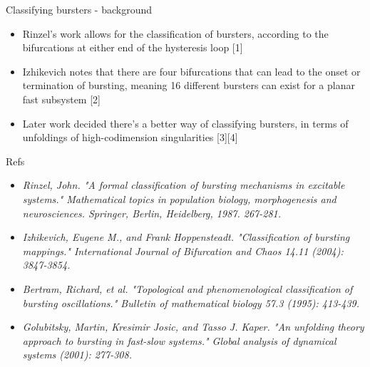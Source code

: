\documentclass{beamer}
\begin{document}
\begin{frame}[label={sec:org27468e7}]{Classifying bursters - background}
\begin{itemize}
\item Rinzel's work allows for the classification of bursters, according to the bifurcations at either end of the hysteresis loop [1]
\item Izhikevich notes that there are four bifurcations that can lead to the onset or termination of bursting, meaning 16 different bursters can exist for a planar fast subsystem [2]
\item Later work decided there's a better way of classifying bursters, in terms of unfoldings of high-codimension singularities [3][4]
\end{itemize}
\end{frame}

\begin{frame}[label={sec:orgd16f4ca}]{Refs}
\begin{itemize}
\item\relax [1] \emph{Rinzel, John. "A formal classification of bursting mechanisms in excitable systems." Mathematical topics in population biology, morphogenesis and neurosciences. Springer, Berlin, Heidelberg, 1987. 267-281.}
\item\relax [2] \emph{Izhikevich, Eugene M., and Frank Hoppensteadt. "Classification of bursting mappings." International Journal of Bifurcation and Chaos 14.11 (2004): 3847-3854.}
\item\relax [3] \emph{Bertram, Richard, et al. "Topological and phenomenological classification of bursting oscillations." Bulletin of mathematical biology 57.3 (1995): 413-439.}
\item\relax [4] \emph{Golubitsky, Martin, Kresimir Josic, and Tasso J. Kaper. "An unfolding theory approach to bursting in fast-slow systems." Global analysis of dynamical systems (2001): 277-308.}
\end{itemize}
\end{frame}
\end{document}

